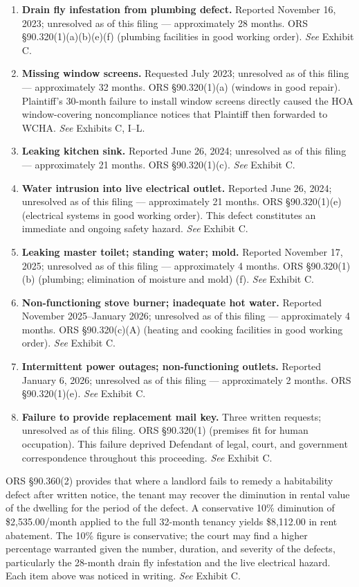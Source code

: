 \documentclass[12pt,letterpaper]{article}
\begin{document}
	\begin{enumerate}[label=(\alph*)]
		\item \textbf{Drain fly infestation from plumbing defect.} Reported November 16, 2023; unresolved as of this filing --- approximately 28 months. ORS \S90.320(1)(a)(b)(e)(f) (plumbing facilities in good working order). \textit{See} Exhibit C.
		\item \textbf{Missing window screens.} Requested July 2023; unresolved as of this filing --- approximately 32 months. ORS \S90.320(1)(a) (windows in good repair). Plaintiff's 30-month failure to install window screens directly caused the HOA window-covering noncompliance notices that Plaintiff then forwarded to WCHA. \textit{See} Exhibits C, I--L.
		\item \textbf{Leaking kitchen sink.} Reported June 26, 2024; unresolved as of this filing --- approximately 21 months. ORS \S90.320(1)(c). \textit{See} Exhibit C.
		\item \textbf{Water intrusion into live electrical outlet.} Reported June 26, 2024; unresolved as of this filing --- approximately 21 months. ORS \S90.320(1)(e) (electrical systems in good working order). This defect constitutes an immediate and ongoing safety hazard. \textit{See} Exhibit C.
		\item \textbf{Leaking master toilet; standing water; mold.} Reported November 17, 2025; unresolved as of this filing --- approximately 4 months. ORS \S90.320(1)(b) (plumbing; elimination of moisture and mold) (f). \textit{See} Exhibit C.
		\item \textbf{Non-functioning stove burner; inadequate hot water.} Reported November 2025--January 2026; unresolved as of this filing --- approximately 4 months. ORS \S90.320(c)(A) (heating and cooking facilities in good working order). \textit{See} Exhibit C.
		\item \textbf{Intermittent power outages; non-functioning outlets.} Reported January 6, 2026; unresolved as of this filing --- approximately 2 months. ORS \S90.320(1)(e). \textit{See} Exhibit C.
		\item \textbf{Failure to provide replacement mail key.} Three written requests; unresolved as of this filing. ORS \S90.320(1) (premises fit for human occupation). This failure deprived Defendant of legal, court, and government correspondence throughout this proceeding. \textit{See} Exhibit C.
	\end{enumerate}
	
	ORS \S90.360(2) provides that where a landlord fails to remedy a habitability defect after written notice, the tenant may recover the diminution in rental value of the dwelling for the period of the defect. A conservative 10\% diminution of \$2,535.00/month applied to the full 32-month tenancy yields \$8,112.00 in rent abatement. The 10\% figure is conservative; the court may find a higher percentage warranted given the number, duration, and severity of the defects, particularly the 28-month drain fly infestation and the live electrical hazard. Each item above was noticed in writing. \textit{See} Exhibit C.
	
\end{document}
